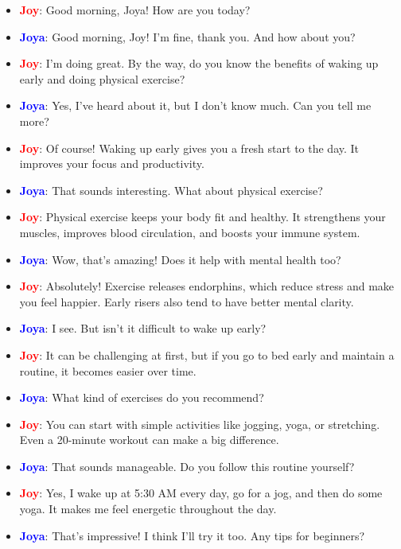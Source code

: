 \documentclass{article}
\begin{document}
\begin{itemize}
    \item \textbf{\textcolor{red}{Joy}}: Good morning, Joya! How are you today?
    \item \textbf{\textcolor{blue}{Joya}}: Good morning, Joy! I’m fine, thank you. And how about you?
    \item \textbf{\textcolor{red}{Joy}}: I’m doing great. By the way, do you know the benefits of waking up early and doing physical exercise?
    \item \textbf{\textcolor{blue}{Joya}}: Yes, I’ve heard about it, but I don’t know much. Can you tell me more?
    \item \textbf{\textcolor{red}{Joy}}: Of course! Waking up early gives you a fresh start to the day. It improves your focus and productivity.
    \item \textbf{\textcolor{blue}{Joya}}: That sounds interesting. What about physical exercise?
    \item \textbf{\textcolor{red}{Joy}}: Physical exercise keeps your body fit and healthy. It strengthens your muscles, improves blood circulation, and boosts your immune system.
    \item \textbf{\textcolor{blue}{Joya}}: Wow, that’s amazing! Does it help with mental health too?
    \item \textbf{\textcolor{red}{Joy}}: Absolutely! Exercise releases endorphins, which reduce stress and make you feel happier. Early risers also tend to have better mental clarity.
    \item \textbf{\textcolor{blue}{Joya}}: I see. But isn’t it difficult to wake up early?
    \item \textbf{\textcolor{red}{Joy}}: It can be challenging at first, but if you go to bed early and maintain a routine, it becomes easier over time.
    \item \textbf{\textcolor{blue}{Joya}}: What kind of exercises do you recommend?
    \item \textbf{\textcolor{red}{Joy}}: You can start with simple activities like jogging, yoga, or stretching. Even a 20-minute workout can make a big difference.
    \item \textbf{\textcolor{blue}{Joya}}: That sounds manageable. Do you follow this routine yourself?
    \item \textbf{\textcolor{red}{Joy}}: Yes, I wake up at 5:30 AM every day, go for a jog, and then do some yoga. It makes me feel energetic throughout the day.
    \item \textbf{\textcolor{blue}{Joya}}: That’s impressive! I think I’ll try it too. Any tips for beginners?

\end{itemize}
\end{document}
